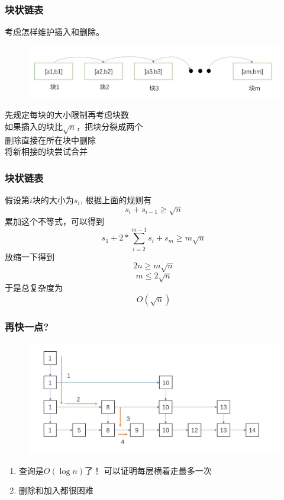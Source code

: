 \documentclass{beamer}
\begin{document}
	\begin{frame}
		\frametitle{块状链表}
		考虑怎样维护插入和删除。\\
		\begin{figure}[H]
			\includegraphics[scale=0.2]{./img/block.jpg}
		\end{figure}
		先规定每块的大小限制再考虑块数\\
		如果插入的块比$\sqrt{n}$，把块分裂成两个\\
		删除直接在所在块中删除 \\
		将新相接的块尝试合并 \\
	\end{frame}

	\begin{frame}
		\frametitle{块状链表}
		假设第$i$块的大小为$s_{i}$,
		根据上面的规则有$$s_{i}+s_{i-1}\geq \sqrt{n}$$
		累加这个不等式，可以得到$$s_{1}+2*\sum_{i=2}^{m-1}s_{i}+s_{m} \geq m\sqrt{n}$$
		放缩一下得到
		$$2n\geq m\sqrt{n}$$$$m\leq 2\sqrt{n}$$
		于是总复杂度为$$O(\sqrt{n})$$
	\end{frame}
	\begin{frame}
		\frametitle{再快一点?}
		\begin{figure}[H]
			\includegraphics[scale=0.25]{./img/fasterter.jpg}
		\end{figure}
		\begin{enumerate}
			\item 查询是$O(\log n)$了！ \quad \pause 可以证明每层横着走最多一次
			\pause
			\item 删除和加入都很困难
		\end{enumerate}
	\end{frame}
\end{document}
